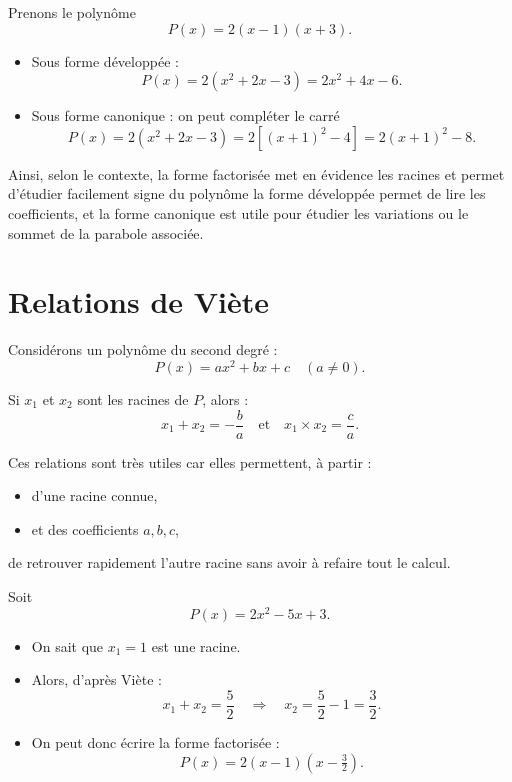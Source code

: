 \documentclass[french]{book}
\begin{document}
\begin{exemple}
Prenons le polynôme 
\[
P(x) = 2(x-1)(x+3).
\]

\begin{itemize}
    \item Sous forme développée :
    \[
    P(x) = 2(x^2 + 2x - 3) = 2x^2 + 4x - 6.
    \]

    \item Sous forme canonique : on peut compléter le carré
    \[
    P(x) = 2\left(x^2 + 2x - 3\right) 
          = 2\left[(x+1)^2 - 4\right] 
          = 2(x+1)^2 - 8.
    \]
\end{itemize}

Ainsi, selon le contexte, la forme factorisée met en évidence les racines et permet d'étudier facilement signe du polynôme la forme développée permet de lire les coefficients, et la forme canonique est utile pour étudier les variations ou le sommet de la parabole associée.

\end{exemple}
\newpage

\section{Relations de Viète}

Considérons un polynôme du second degré :
\[
P(x) = ax^2 + bx + c \quad (a \neq 0).
\]

\begin{prop}
Si $x_1$ et $x_2$ sont les racines de $P$, alors :
\[
x_1 + x_2 = -\frac{b}{a}
\quad \text{et} \quad
x_1 \times x_2 = \frac{c}{a}.
\]

\end{prop}

\begin{rem}
Ces relations sont très utiles car elles permettent, à partir :
\begin{itemize}
    \item d’une racine connue,
    \item et des coefficients $a, b, c$,
\end{itemize}
de retrouver rapidement l’autre racine sans avoir à refaire tout le calcul.
\end{rem}

\begin{exemple}
Soit 
\[
P(x) = 2x^2 - 5x + 3.
\]

\begin{itemize}
    \item On sait que $x_1 = 1$ est une racine.
    \item Alors, d’après Viète :
    \[
    x_1 + x_2 = \frac{5}{2} \quad \Rightarrow \quad x_2 = \frac{5}{2} - 1 = \frac{3}{2}.
    \]
    
    \item On peut donc écrire la forme factorisée :
    \[
    P(x) = 2(x - 1)\left(x - \tfrac{3}{2}\right).
    \]
\end{itemize}

\end{exemple}
\end{document}
